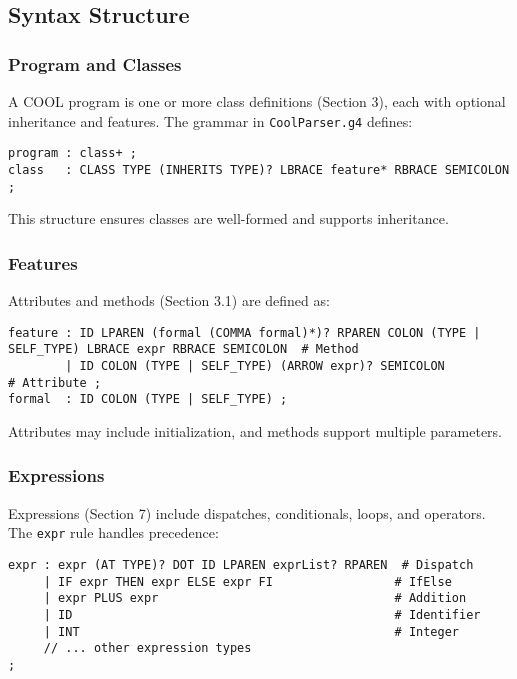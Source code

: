 \documentclass[11pt, titlepage]{article}
\begin{document}
\subsection{Syntax Structure}

\subsubsection{Program and Classes}
A COOL program is one or more class definitions (Section 3), each with optional inheritance and features. The grammar in \texttt{CoolParser.g4} defines:

\begin{lstlisting}
program : class+ ;
class   : CLASS TYPE (INHERITS TYPE)? LBRACE feature* RBRACE SEMICOLON ;
\end{lstlisting}

This structure ensures classes are well-formed and supports inheritance.

\subsubsection{Features}
Attributes and methods (Section 3.1) are defined as:

\begin{lstlisting}
feature : ID LPAREN (formal (COMMA formal)*)? RPAREN COLON (TYPE | SELF_TYPE) LBRACE expr RBRACE SEMICOLON  # Method
        | ID COLON (TYPE | SELF_TYPE) (ARROW expr)? SEMICOLON                                        # Attribute ;
formal  : ID COLON (TYPE | SELF_TYPE) ;
\end{lstlisting}

Attributes may include initialization, and methods support multiple parameters.

\subsubsection{Expressions}
Expressions (Section 7) include dispatches, conditionals, loops, and operators. The \texttt{expr} rule handles precedence:

\begin{lstlisting}
expr : expr (AT TYPE)? DOT ID LPAREN exprList? RPAREN  # Dispatch
     | IF expr THEN expr ELSE expr FI                 # IfElse
     | expr PLUS expr                                 # Addition
     | ID                                             # Identifier
     | INT                                            # Integer
     // ... other expression types
;
\end{lstlisting}
\end{document}
